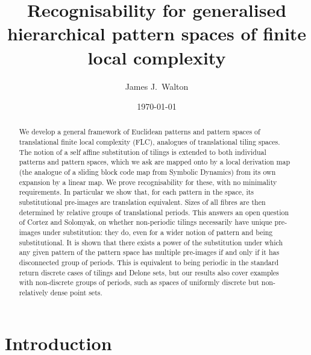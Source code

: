 \documentclass[11pt]{amsart}
\title[Recognisability for generalised FLC pattern spaces]{\bf Recognisability for generalised hierarchical pattern spaces of finite local complexity}
\date{\today}
\author{James J.\ Walton}
\numberwithin{equation}{section}
\theoremstyle{plain}
\theoremstyle{definition}
\begin{document}
\begin{abstract}
We develop a general framework of Euclidean patterns and pattern spaces of translational finite local complexity (FLC), analogues of translational tiling spaces. The notion of a self affine substitution of tilings is extended to both individual patterns and pattern spaces, which we ask are mapped onto by a local derivation map (the analogue of a sliding block code map from Symbolic Dynamics) from its own expansion by a linear map. We prove recognisability for these, with no minimality requirements. In particular we show that, for each pattern in the space, its substitutional pre-images are translation equivalent. Sizes of all fibres are then determined by relative groups of translational periods. This answers an open question of Cortez and Solomyak, on whether non-periodic tilings necessarily have unique pre-images under substitution: they do, even for a wider notion of pattern and being substitutional. It is shown that there exists a power of the substitution under which any given pattern of the pattern space has multiple pre-images if and only if it has disconnected group of periods. This is equivalent to being periodic in the standard return discrete cases of tilings and Delone sets, but our results also cover examples with non-discrete groups of periods, such as spaces of uniformly discrete but non-relatively dense point sets.
\end{abstract}

\maketitle



\section{Introduction}
\end{document}
